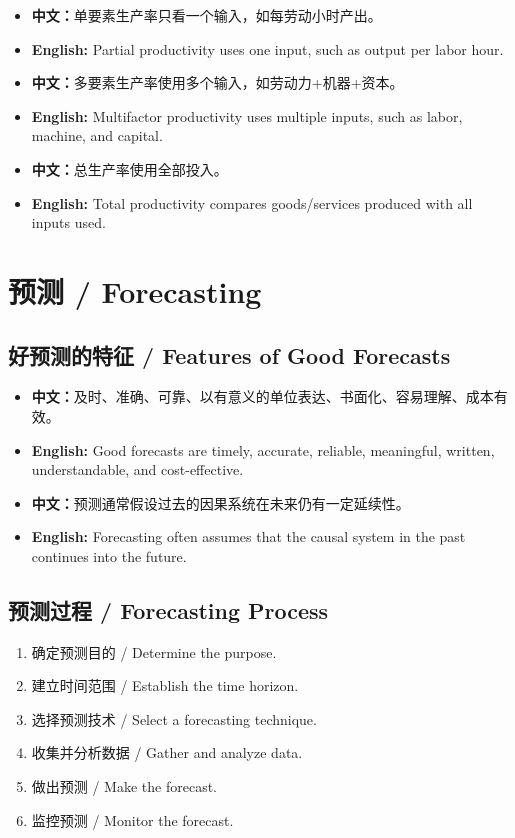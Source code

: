 \documentclass[11pt,a4paper]{ctexart}
\newcommand{\cn}[1]{\textbf{中文：}#1}
\newcommand{\en}[1]{\textbf{English:} #1}
\begin{document}
\begin{itemize}
  \item \cn{单要素生产率只看一个输入，如每劳动小时产出。}
  \item \en{Partial productivity uses one input, such as output per labor hour.}
  \item \cn{多要素生产率使用多个输入，如劳动力+机器+资本。}
  \item \en{Multifactor productivity uses multiple inputs, such as labor, machine, and capital.}
  \item \cn{总生产率使用全部投入。}
  \item \en{Total productivity compares goods/services produced with all inputs used.}
\end{itemize}

\section{预测 / Forecasting}

\subsection{好预测的特征 / Features of Good Forecasts}
\begin{itemize}
  \item \cn{及时、准确、可靠、以有意义的单位表达、书面化、容易理解、成本有效。}
  \item \en{Good forecasts are timely, accurate, reliable, meaningful, written, understandable, and cost-effective.}
  \item \cn{预测通常假设过去的因果系统在未来仍有一定延续性。}
  \item \en{Forecasting often assumes that the causal system in the past continues into the future.}
\end{itemize}

\subsection{预测过程 / Forecasting Process}
\begin{enumerate}
  \item 确定预测目的 / Determine the purpose.
  \item 建立时间范围 / Establish the time horizon.
  \item 选择预测技术 / Select a forecasting technique.
  \item 收集并分析数据 / Gather and analyze data.
  \item 做出预测 / Make the forecast.
  \item 监控预测 / Monitor the forecast.
\end{enumerate}
\end{document}
